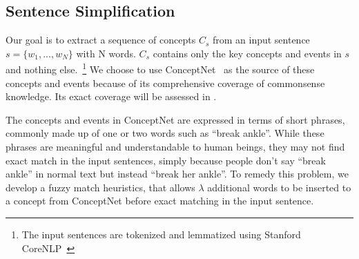 \subsection{Sentence Simplification}
\label{sec:sentence simplification}


Our goal is to extract a sequence of concepts $C_s$
from an input sentence $s = \{w_1, ..., w_N\}$ with N words. 
$C_s$ contains only the key concepts and events in $s$ and 
nothing else.~\footnote{The input sentences are 
tokenized and lemmatized using Stanford CoreNLP~\cite{manning2014stanford} }
We choose to use ConceptNet~\cite{speer2017conceptnet} as the source of
these concepts and events because of its comprehensive coverage of 
commonsense knowledge. Its exact coverage will be assessed 
in . 

The concepts and events in ConceptNet are
expressed in terms of short phrases, commonly made up of one or two words
such as ``break ankle''. While these phrases are meaningful and
understandable to human beings, they may not find exact match
in the input sentences, simply because people don't say ``break ankle'' in
normal text but instead ``break her ankle''.  
To remedy this problem, we develop a fuzzy match heuristics, that allows
$\lambda$ additional words to be inserted to a concept from ConceptNet
before exact matching in the input sentence.

